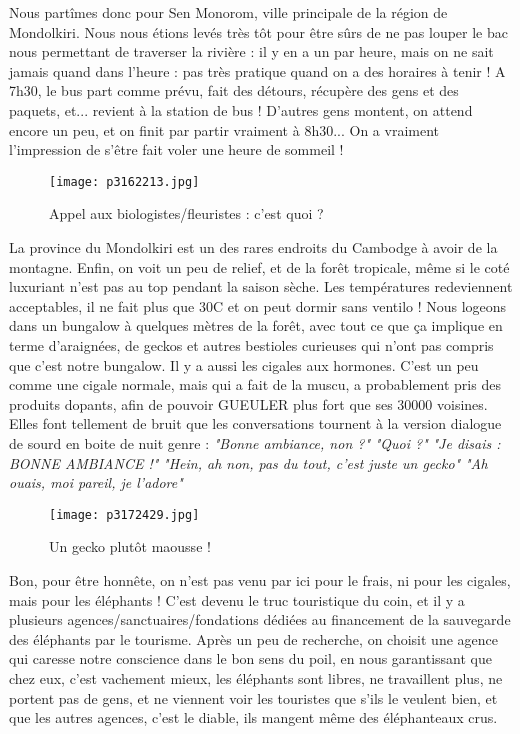 \documentclass{book}
\begin{document}
Nous partîmes donc pour Sen Monorom, ville principale de la région de Mondolkiri. Nous nous étions levés très tôt pour être sûrs de ne pas louper le bac nous permettant de traverser la rivière : il y en a un par heure, mais on ne sait jamais quand dans l'heure : pas très pratique quand on a des horaires à tenir ! A 7h30, le bus part comme prévu, fait des détours, récupère des gens et des paquets, et... revient à la station de bus ! D'autres gens montent, on attend encore un peu, et on finit par partir vraiment à 8h30... On a vraiment l'impression de s'être fait voler une heure de sommeil !


\begin{figure}[h]
\centering
\texttt{[image: p3162213.jpg]}
\caption*{Appel aux biologistes/fleuristes : c'est quoi ?}
\end{figure}

La province du Mondolkiri est un des rares endroits du Cambodge à avoir de la montagne. Enfin, on voit un peu de relief, et de la forêt tropicale, même si le coté luxuriant n'est pas au top pendant la saison sèche. Les températures redeviennent acceptables, il ne fait plus que 30\textdegree C et on peut dormir sans ventilo ! Nous logeons dans un bungalow à quelques mètres de la forêt, avec tout ce que ça implique en terme d'araignées, de geckos et autres bestioles curieuses qui n'ont pas compris que c'est notre bungalow. Il y a aussi les cigales aux hormones. C'est un peu comme une cigale normale, mais qui a fait de la muscu, a probablement pris des produits dopants, afin de pouvoir GUEULER plus fort que ses 30000 voisines. Elles font tellement de bruit que les conversations tournent à la version dialogue de sourd en boite de nuit genre :
\emph{"Bonne ambiance, non ?"}
\emph{"Quoi ?"}
\emph{"Je disais : BONNE AMBIANCE !"}
\emph{"Hein, ah non, pas du tout, c'est juste un gecko"}
\emph{"Ah ouais, moi pareil, je l'adore"}


\begin{figure}[h]
\centering
\texttt{[image: p3172429.jpg]}
\caption*{Un gecko plutôt maousse !}
\end{figure}

Bon, pour être honnête, on n'est pas venu par ici pour le frais, ni pour les cigales, mais pour les éléphants ! C'est devenu le truc touristique du coin, et il y a plusieurs agences/sanctuaires/fondations dédiées au financement de la sauvegarde des éléphants par le tourisme. Après un peu de recherche, on choisit une agence qui caresse notre conscience dans le bon sens du poil, en nous garantissant que chez eux, c'est vachement mieux, les éléphants sont libres, ne travaillent plus, ne portent pas de gens, et ne viennent voir les touristes que s'ils le veulent bien, et que les autres agences, c'est le diable, ils mangent même des éléphanteaux crus.
\end{document}

